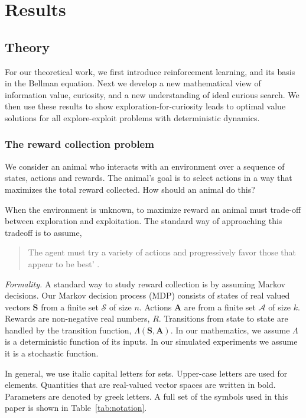 \section*{Results} 
\subsection*{Theory}
For our theoretical work, we first introduce reinforcement learning, and its basis in the Bellman equation. Next we develop a new mathematical view of information value, curiosity, and a new understanding of ideal curious search. We then use these results to show exploration-for-curiosity leads to optimal value solutions for all explore-exploit problems with deterministic dynamics.

\subsubsection*{The reward collection problem}
We consider an animal who interacts with an environment over a sequence of states, actions and rewards. The animal's goal is to select actions in a way that maximizes the total reward collected. How should an animal do this? 

When the environment is unknown, to maximize reward an animal must trade-off between exploration and exploitation. The standard way of approaching this tradeoff is to assume, 

\begin{quote}
The agent must try a variety of actions and progressively favor those that appear to be best' \cite{Sutton2018}. 
\end{quote}

\emph{Formality.} A standard way to study reward collection is by assuming Markov decisions. Our Markov decision process (MDP) consists of states of real valued vectors $\mathbf{S}$ from a finite set $\mathcal{S}$ of size $n$. Actions $\mathbf{A}$ are from a finite set $\mathcal{A}$ of size $k$. Rewards are non-negative real numbers, $R$. Transitions from state to state are handled by the transition function, $\Lambda(\mathbf{S},\mathbf{A})$. In our mathematics, we assume $\Lambda$ is a deterministic function of its inputs. In our simulated experiments we assume it is a stochastic function.

In general, we use italic capital letters for sets. Upper-case letters are used for elements. Quantities that are real-valued vector spaces are written in bold. Parameters are denoted by greek letters. A full set of the symbols used in this paper is shown in Table~\ref{tab:notation}.


